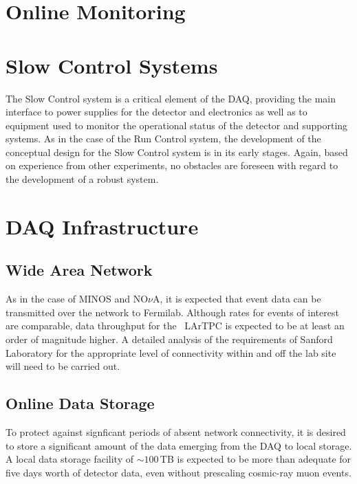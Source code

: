 \section{Online Monitoring}
\label{sec:daq_om}

\section{Slow Control Systems }
\label{sec:daq_slowcontrol}

The Slow Control system is a critical element of the DAQ, providing the 
main interface to power supplies for the detector and electronics as well  
as to equipment used to monitor the operational status of the detector and 
supporting systems.  As in the case of the Run Control system, the 
development of the conceptual design for the Slow Control system is in 
its early stages.  Again, based on experience from other experiments, 
no obstacles are foreseen with regard to the development of a robust 
system.

\section{DAQ Infrastructure }
\label{sec:daq_infrastructure}

\subsection{Wide Area Network}

As in the case of MINOS and NO$\nu$A, it is expected that event data can be 
transmitted over the network to Fermilab.  Although rates for events of 
interest are comparable, data throughput for the \LBNE\ LArTPC is 
expected to be at least an order of magnitude higher.  A detailed 
analysis of the requirements of Sanford Laboratory for the appropriate level of 
connectivity within and off the lab site will need to be carried out.

\subsection{Online Data Storage}

To protect against signficant periods of absent network connectivity, it 
is desired to store a significant amount of the data emerging from the 
DAQ to local storage.  A local data storage facility of $\sim 100\,$TB is 
expected to be more than adequate for five days worth of detector data, 
even without prescaling cosmic-ray muon events.

